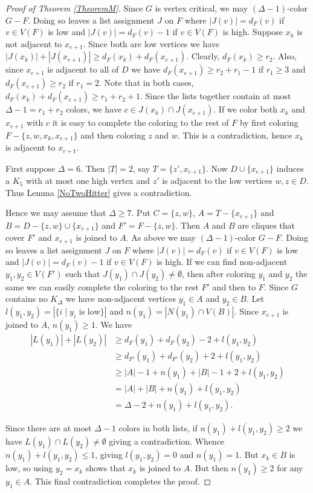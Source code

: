 \documentclass[11pt]{amsart}
\theoremstyle{plain}
\theoremstyle{definition}
\theoremstyle{remark}
\begin{document}
\begin{proof}[Proof of Theorem \ref{TheoremM}]
Since $G$ is vertex critical, we may $(\Delta - 1)$-color $G - F$.  Doing so leaves a list assignment $J$ on $F$ where $|J(v)| = d_F(v)$ if $v \in V(F)$ is low and $|J(v)| = d_F(v) - 1$ if $v \in V(F)$ is high.  Suppose $x_k$ is not adjacent to $x_{e + 1}$.  Since both are low vertices we have $|J(x_k)| + |J(x_{e+1})| \geq d_F(x_k) + d_F(x_{e+1})$.  Clearly, $d_F(x_k) \geq r_2$.  Also, since $x_{e+1}$ is adjacent to all of $D$ we have $d_F(x_{e+1}) \geq r_2 + r_1 - 1$ if $r_1 \geq 3$ and $d_F(x_{e+1}) \geq r_2$ if $r_1 = 2$.  Note that in both cases, $d_F(x_k) + d_F(x_{e+1}) \geq r_1 + r_2 + 1$.  Since the lists together contain at most $\Delta - 1 = r_1 + r_2$ colors, we have $c \in J(x_k) \cap J(x_{e+1})$.  If we color both $x_k$ and $x_{e+1}$ with $c$ it is easy to complete the coloring to the rest of $F$ by first coloring $F - \{z,w, x_k, x_{e+1}\}$ and then coloring $z$ and $w$.  This is a contradiction, hence $x_k$ is adjacent to $x_{e + 1}$.

First suppose $\Delta = 6$.  Then $|T| = 2$, say $T = \{z', x_{e + 1}\}$.  Now $D \cup \{x_{e + 1}\}$ induces a $K_5$ with at most one high vertex and $z'$ is adjacent to the low vertices $w, z \in D$.  Thus Lemma \ref{NoTwoHitter} gives a contradiction.

Hence we may assume that $\Delta \geq 7$.  Put $C = \{z, w\}$, $A = T - \{x_{e+1}\}$ and $B = D - \{z, w\} \cup \{x_{e+1}\}$ and $F' = F - \{z, w\}$.  Then $A$ and $B$ are cliques that cover $F'$ and $x_{e+1}$ is joined to $A$.  As above we may $(\Delta - 1)$-color $G - F$.  Doing so leaves a list assignment $J$ on $F$ where $|J(v)| = d_F(v)$ if $v \in V(F)$ is low and $|J(v)| = d_F(v) - 1$ if $v \in V(F)$ is high.  If we can find non-adjacent $y_1, y_2 \in V(F')$ such that $J(y_1) \cap J(y_2) \neq \emptyset$, then after coloring $y_1$ and $y_2$ the same we can easily complete the coloring to the rest $F'$ and then to $F$.  Since $G$ contains no $K_{\Delta}$ we have non-adjacent vertices $y_1 \in A$ and $y_2 \in B$. Let $l(y_1, y_2) = |\{i \mid y_i \text{ is low}\}|$ and $n(y_1) = |N(y_1) \cap V(B)|$.  Since $x_{e+1}$ is joined to $A$, $n(y_1) \geq 1$. We have
\begin{align*}
|L(y_1)| + |L(y_2)| &\geq d_F(y_1) + d_F(y_2) - 2 + l(y_1, y_2)\\
&\geq d_{F'}(y_1) + d_{F'}(y_2) + 2 + l(y_1, y_2)\\
&\geq |A| - 1 + n(y_1) + |B| - 1 + 2 + l(y_1, y_2)\\
&= |A| + |B| + n(y_1) + l(y_1, y_2)\\
&= \Delta - 2 + n(y_1) + l(y_1, y_2).
\end{align*}

Since there are at most $\Delta - 1$ colors in both lists, if $n(y_1) + l(y_1, y_2) \geq 2$ we have $L(y_1) \cap L(y_2) \neq \emptyset$ giving a contradiction.  Whence
$n(y_1) + l(y_1, y_2) \leq 1$, giving $l(y_1, y_2) = 0$ and $n(y_1) = 1$.  But $x_k \in B$ is low, so using $y_2 = x_k$ shows that $x_k$ is joined to $A$.  But then $n(y_1) \geq 2$ for any $y_1 \in A$.  This final contradiction completes the proof.
\end{proof}
\end{document}
